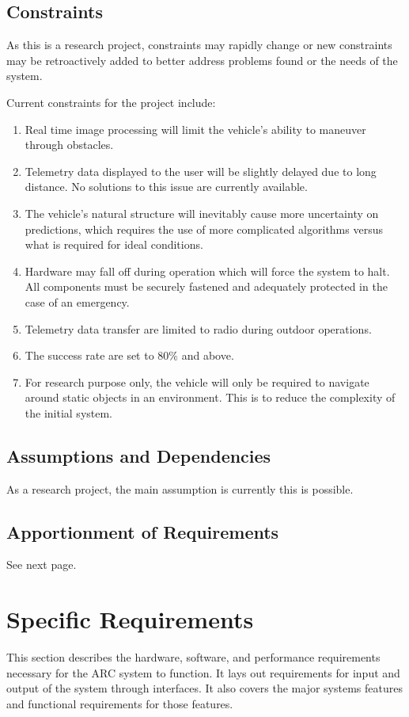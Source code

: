 \documentclass[compsoc,draftclsnofoot,onecolumn,10pt]{IEEEtran}
\begin{document}
\subsection{Constraints} %
As this is a research project, constraints may rapidly change or new constraints may be retroactively added to better address problems found or the needs of the system. \par
Current constraints for the project include: 
\begin{enumerate}
	\item Real time image processing will limit the vehicle's ability to maneuver through obstacles. 
	\item Telemetry data displayed to the user will be slightly delayed due to long distance. 
	No solutions to this issue are currently available.
	\item The vehicle's natural structure will inevitably cause more uncertainty on predictions, which requires the use of more complicated algorithms versus what is required for ideal conditions.
	\item Hardware may fall off during operation which will force the system to halt. 
	All components must be securely fastened and adequately protected in the case of an emergency.  
	\item Telemetry data transfer are limited to radio during outdoor operations.
	\item The success rate are set to 80\% and above.
	\item For research purpose only, the vehicle will only be required to navigate around static objects in an environment. 
	This is to reduce the complexity of the initial system. 
\end{enumerate}

\subsection{Assumptions and Dependencies}
As a research project, the main assumption is currently this is possible. 

\subsection{Apportionment of Requirements} %
See next page.



\section{Specific Requirements} %
This section describes the hardware, software, and performance requirements
necessary for the ARC system to function. It lays out requirements for
input and output of the system through interfaces. It also covers the major
systems features and functional requirements for those features.
\end{document}
